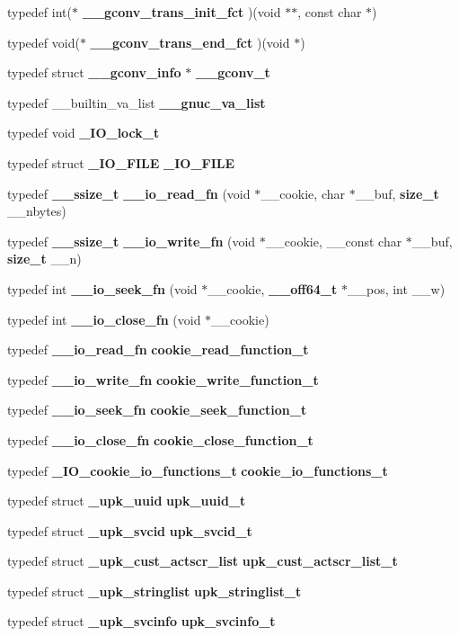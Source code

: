 \begin{DoxyCompactItemize}
\item 
typedef int($\ast$ {\bf \_\-\_\-gconv\_\-trans\_\-init\_\-fct} )(void $\ast$$\ast$, const char $\ast$)
\item 
typedef void($\ast$ {\bf \_\-\_\-gconv\_\-trans\_\-end\_\-fct} )(void $\ast$)
\item 
typedef struct {\bf \_\-\_\-gconv\_\-info} $\ast$ {\bf \_\-\_\-gconv\_\-t}
\item 
typedef \_\-\_\-builtin\_\-va\_\-list {\bf \_\-\_\-gnuc\_\-va\_\-list}
\item 
typedef void {\bf \_\-IO\_\-lock\_\-t}
\item 
typedef struct {\bf \_\-IO\_\-FILE} {\bf \_\-IO\_\-FILE}
\item 
typedef {\bf \_\-\_\-ssize\_\-t} {\bf \_\-\_\-io\_\-read\_\-fn} (void $\ast$\_\-\_\-cookie, char $\ast$\_\-\_\-buf, {\bf size\_\-t} \_\-\_\-nbytes)
\item 
typedef {\bf \_\-\_\-ssize\_\-t} {\bf \_\-\_\-io\_\-write\_\-fn} (void $\ast$\_\-\_\-cookie, \_\-\_\-const char $\ast$\_\-\_\-buf, {\bf size\_\-t} \_\-\_\-n)
\item 
typedef int {\bf \_\-\_\-io\_\-seek\_\-fn} (void $\ast$\_\-\_\-cookie, {\bf \_\-\_\-off64\_\-t} $\ast$\_\-\_\-pos, int \_\-\_\-w)
\item 
typedef int {\bf \_\-\_\-io\_\-close\_\-fn} (void $\ast$\_\-\_\-cookie)
\item 
typedef {\bf \_\-\_\-io\_\-read\_\-fn} {\bf cookie\_\-read\_\-function\_\-t}
\item 
typedef {\bf \_\-\_\-io\_\-write\_\-fn} {\bf cookie\_\-write\_\-function\_\-t}
\item 
typedef {\bf \_\-\_\-io\_\-seek\_\-fn} {\bf cookie\_\-seek\_\-function\_\-t}
\item 
typedef {\bf \_\-\_\-io\_\-close\_\-fn} {\bf cookie\_\-close\_\-function\_\-t}
\item 
typedef {\bf \_\-IO\_\-cookie\_\-io\_\-functions\_\-t} {\bf cookie\_\-io\_\-functions\_\-t}
\item 
typedef struct {\bf \_\-upk\_\-uuid} {\bf upk\_\-uuid\_\-t}
\item 
typedef struct {\bf \_\-upk\_\-svcid} {\bf upk\_\-svcid\_\-t}
\item 
typedef struct {\bf \_\-upk\_\-cust\_\-actscr\_\-list} {\bf upk\_\-cust\_\-actscr\_\-list\_\-t}
\item 
typedef struct {\bf \_\-upk\_\-stringlist} {\bf upk\_\-stringlist\_\-t}
\item 
typedef struct {\bf \_\-upk\_\-svcinfo} {\bf upk\_\-svcinfo\_\-t}
$$
\end{DoxyCompactItemize}
